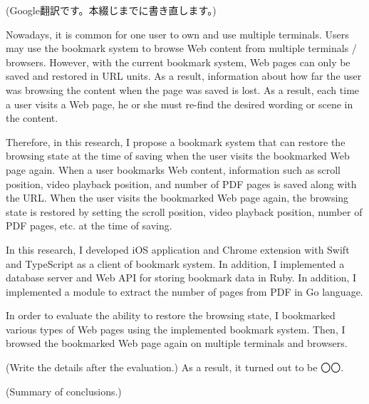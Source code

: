 \begin{eabstract}

  (Google翻訳です。本綴じまでに書き直します。)

  Nowadays, it is common for one user to own and use multiple terminals.
  Users may use the bookmark system to browse Web content from multiple terminals / browsers.
  However, with the current bookmark system, Web pages can only be saved and restored in URL units.
  As a result, information about how far the user was browsing the content when the page was saved is lost.
  As a result, each time a user visits a Web page, he or she must re-find the desired wording or scene in the content.

  Therefore, in this research, I propose a bookmark system that can restore the browsing state at the time of saving when the user visits the bookmarked Web page again.
  When a user bookmarks Web content, information such as scroll position, video playback position, and number of PDF pages is saved along with the URL.
  When the user visits the bookmarked Web page again, the browsing state is restored by setting the scroll position, video playback position, number of PDF pages, etc. at the time of saving.

  In this research, I developed iOS application and Chrome extension with Swift and TypeScript as a client of bookmark system.
  In addition, I implemented a database server and Web API for storing bookmark data in Ruby.
  In addition, I implemented a module to extract the number of pages from PDF in Go language.

  In order to evaluate the ability to restore the browsing state, I bookmarked various types of Web pages using the implemented bookmark system.
  Then, I browsed the bookmarked Web page again on multiple terminals and browsers.

  (Write the details after the evaluation.)
  As a result, it turned out to be 〇〇.

  (Summary of conclusions.)

\end{eabstract}
